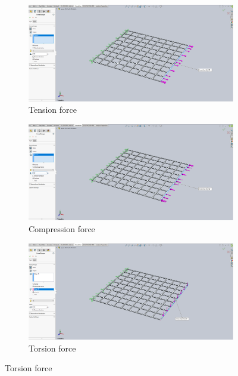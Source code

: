 \documentclass[12pt, letterpaper]{article}
\begin{document}
\begin{figure}[H]
	\centering
	\label{fig:forces}
	\begin{subfigure}[t]{.8\linewidth}
		\includegraphics[width=\linewidth]{./procedure/tension-force}
		\caption{Tension force}
	\end{subfigure}
	\begin{subfigure}[t]{.8\linewidth}
		\includegraphics[width=\linewidth]{./procedure/compression-force}
		\caption{Compression force}
	\end{subfigure}
	\begin{subfigure}[t]{.8\linewidth}
		\includegraphics[width=\linewidth]{./procedure/torsion-force}
		\caption{Torsion force}
	\end{subfigure}
\end{figure}
\end{document}
